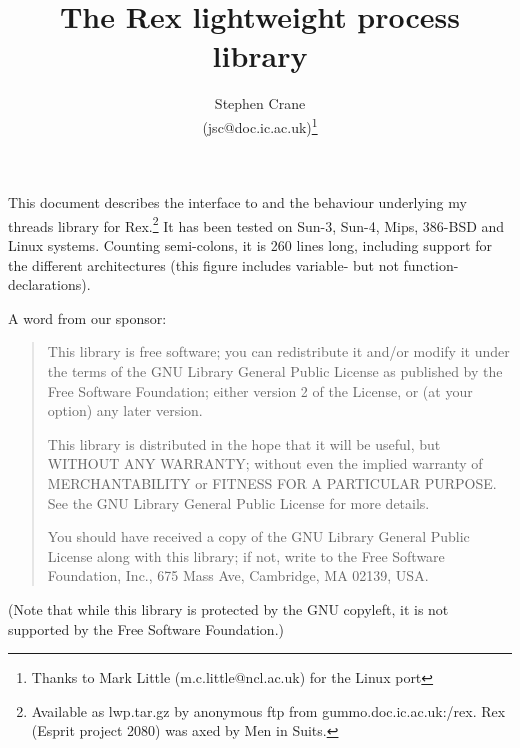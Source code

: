 \title{The {\sc Rex} lightweight process library}
\author{Stephen Crane\\ (jsc@doc.ic.ac.uk)\thanks{Thanks to Mark Little
(m.c.little@ncl.ac.uk) for the Linux port}}

\maketitle
This document describes the interface to and the behaviour underlying
my threads library for Rex.\footnote{Available as lwp.tar.gz by anonymous 
ftp from gummo.doc.ic.ac.uk:/rex.  Rex (Esprit project 2080) was
axed by Men in Suits.}  It has been tested on Sun-3, Sun-4,
Mips, 386-BSD and Linux systems.  Counting semi-colons, it is 
260 lines long, including support for the different architectures (this
figure includes variable- but not function-declarations).

A word from our sponsor:
\begin{quote}
This library is free software; you can redistribute it and/or
modify it under the terms of the GNU Library General Public
License as published by the Free Software Foundation; either
version 2 of the License, or (at your option) any later version.

This library is distributed in the hope that it will be useful,
but {\sc WITHOUT ANY WARRANTY}; without even the implied warranty of
{\sc MERCHANTABILITY or FITNESS FOR A PARTICULAR PURPOSE}.  See the GNU
Library General Public License for more details.

You should have received a copy of the GNU Library General Public
License along with this library; if not, write to the Free
Software Foundation, Inc., 675 Mass Ave, Cambridge, MA 02139, USA.
\end{quote}

(Note that while this library is protected by the GNU copyleft, it is not
supported by the Free Software Foundation.)

